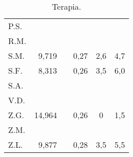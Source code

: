 \begin{table}[!h]
\begin{center}
\begin{tabular}{lrcccl}
P.S.	&            &            &             &                  &     \\
R.M.	&            &            &             &                  &     \\
S.M.	& 9,719      & \checkmark &  0,27       & 2,6              & 4,7 \\
S.F.	& 8,313      &            &  0,26       & 3,5              & 6,0 \\
S.A.	&            &            &             &                  &     \\
V.D.	&            &            &             &                  &     \\
Z.G.	& 14,964     &            &  0,26       & 0                & 1,5 \\
Z.M.	&            &            &             &                  &     \\
Z.L.	& 9,877      &            &  0,28       & 3,5              & 5,5 \\
\bottomrule
\end{tabular}
\end{center}
\caption{Terapia.}
\label{tab:Terapia}
\end{table}

